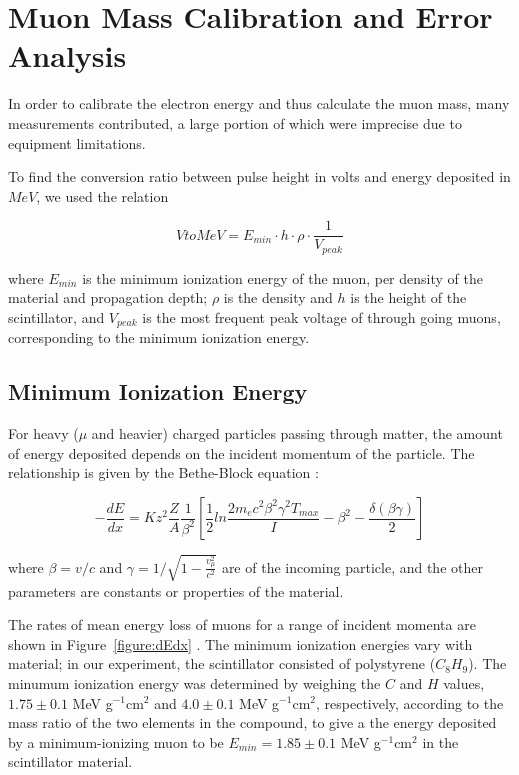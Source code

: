 
\section{Muon Mass Calibration and Error Analysis}\label{masscalibration}

In order to calibrate the electron energy and thus calculate the muon
mass, many measurements contributed, a large portion of which were
imprecise due to equipment limitations.

To find the conversion ratio between pulse height in volts and energy
deposited in $MeV$, we used the relation

\begin{equation} VtoMeV = E_{min}\cdot h\cdot\rho\cdot\frac{1}{V_{peak}}\end{equation}   

where $E_{min}$ is the minimum ionization energy of the muon, per
density of the material and propagation depth; $\rho$ is the density
and $h$ is the height of the scintillator, and $V_{peak}$ is the most
frequent peak voltage of through going muons, corresponding to the
minimum ionization energy.

\subsection{Minimum Ionization Energy}\label{minionizationenergy}

For heavy ($\mu$ and heavier) charged particles passing through
matter, the amount of energy deposited depends on the incident
momentum of the particle. The relationship is given by the Bethe-Block
equation \cite{yao}:

\begin{equation}
-\frac{dE}{dx} = Kz^2\frac{Z}{A}\frac{1}{\beta^2}\left[\frac{1}{2}ln\frac{2m_ec^2\beta^2\gamma^2T_{max}}{I} - \beta^2 - \frac{\delta(\beta\gamma)}{2}\right]
\end{equation}

where $\beta = v/c$ and $\gamma = 1/\sqrt{1 - \frac{v_{\mu}^2}{c^2}}$
are of the incoming particle, and the other parameters are constants
or properties of the material.

The rates of mean energy loss of muons for a range of incident momenta
are shown in Figure~\ref{figure:dEdx} \cite{yao}. The minimum
ionization energies vary with material; in our experiment, the
scintillator consisted of polystyrene ($C_8H_9$). The minumum
ionization energy was determined by weighing the $C$ and $H$ values,
$1.75\pm 0.1$ MeV g$^{-1}$cm$^{2}$ and $4.0\pm 0.1$
MeV g$^{-1}$cm$^{2}$, respectively, according to the mass ratio of the
two elements in the compound, to give a the energy deposited by a
minimum-ionizing muon to be $E_{min} = 1.85 \pm 0.1$ MeV g$^{-1}$cm$^{2}$ in the
scintillator material.

